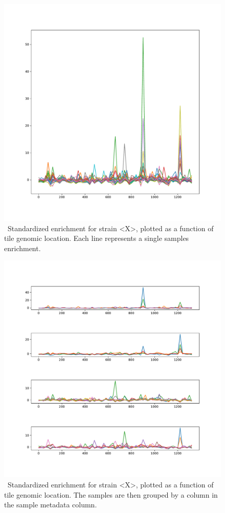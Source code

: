 \documentclass{article}
\newcommand{\beginsupplement}{%
        \setcounter{table}{0}
        \renewcommand{\thetable}{S\arabic{table}}%
        \setcounter{figure}{0}
        \renewcommand{\thefigure}{S\arabic{figure}}%
     }
\begin{document}
\begin{figure}
\centering
\includegraphics[width=1.0\textwidth]{figures/ANON_all_samples.pdf}
\caption{ \
Standardized enrichment for strain <X>, plotted as a function of tile genomic location. Each line represents a single samples enrichment.
}
\label{fig:anon_all}
\end{figure}



\begin{figure}
\centering
\includegraphics[width=1.0\textwidth]{figures/ANON_split.pdf}
\caption{ \
Standardized enrichment for strain <X>, plotted as a function of tile genomic location. The samples are then grouped by a column in the sample metadata column.
}
\label{fig:anon_split}
\end{figure}

\clearpage



\end{document}
